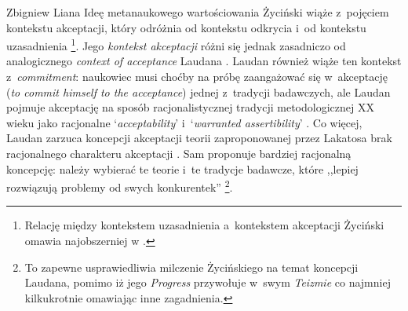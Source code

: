\begin{artplenv}{Zbigniew Liana}
Ideę metanaukowego wartościowania Życiński wiąże z~pojęciem kontekstu akceptacji, który odróżnia od kontekstu odkrycia i~od kontekstu uzasadnienia
\parencite[zob.][s.~225]{zycinski_teizm_1985}%
\footnote{Relację między kontekstem uzasadnienia a~kontekstem akceptacji Życiński omawia najobszerniej w
\parencite[][s.~216–232]{zycinski_teizm_1985}. %
 }. Jego \textit{kontekst akceptacji} różni się jednak zasadniczo od analogicznego \textit{context of acceptance} Laudana 
\parencite*[][s.~108nn]{laudan_progress_1977}. %
 Laudan również wiąże ten kontekst z~\textit{commitment}: naukowiec musi choćby na próbę zaangażować się w~akceptację (\textit{to commit himself to the acceptance}) jednej z~tradycji badawczych, ale Laudan pojmuje akceptację na sposób racjonalistycznej tradycji metodologicznej XX wieku jako racjonalne ‘\textit{acceptability}' i~‘\textit{warranted assertibility}' 
\parencite[][s.~110]{laudan_progress_1977}. %
 Co więcej, Laudan zarzuca koncepcji akceptacji teorii zaproponowanej przez Lakatosa brak racjonalnego charakteru akceptacji 
\parencite[][s.~77n]{laudan_progress_1977}. %
 Sam proponuje bardziej racjonalną koncepcję: należy wybierać te teorie i~te tradycje badawcze, które ,,lepiej rozwiązują problemy od swych konkurentek'' 
\parencite[][s.~109]{laudan_progress_1977}%
\footnote{To zapewne usprawiedliwia milczenie Życińskiego na temat koncepcji Laudana, pomimo iż jego \textit{Progress} 
\parencite*[][]{laudan_progress_1977} %
 przywołuje w~swym \textit{Teizmie} 
\parencite*[][]{zycinski_teizm_1985} %
 co najmniej kilkukrotnie omawiając inne zagadnienia.}.


\end{artplenv}
